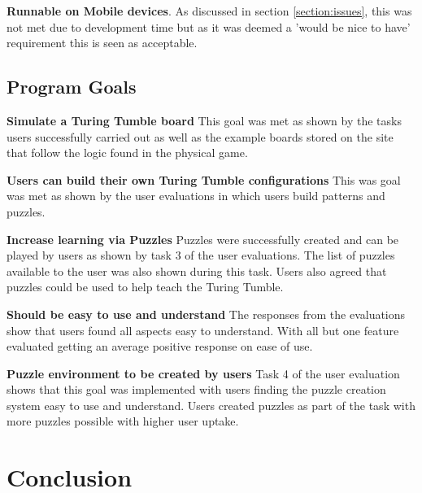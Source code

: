 \documentclass{l4proj}
\begin{document}
\textbf{Runnable on Mobile devices}. As discussed in section \ref{section:issues}, this was not met due to development time but as it was deemed a 'would be nice to have' requirement this is seen as acceptable. 

\section{Program Goals}

\textbf{Simulate a Turing Tumble board} This goal was met as shown by the tasks users successfully carried out as well as the example boards stored on the site that follow the logic found in the physical game.

\textbf{Users can build their own Turing Tumble configurations} This was goal was met as shown by the user evaluations in which users build patterns and puzzles.

\textbf{Increase learning via Puzzles} Puzzles were successfully created and can be played by users as shown by task 3 of the user evaluations. The list of puzzles available to the user was also shown during this task. Users also agreed that puzzles could be used to help teach the Turing Tumble.

\textbf{Should be easy to use and understand} The responses from the evaluations show that users found all aspects easy to understand. With all but one feature evaluated getting an average positive response on ease of use. 

\textbf{Puzzle environment to be created by users} Task 4 of the user evaluation shows that this goal was implemented with users finding the puzzle creation system easy to use and understand. Users created puzzles as part of the task with more puzzles possible with higher user uptake. 





\chapter{Conclusion}
\end{document}
